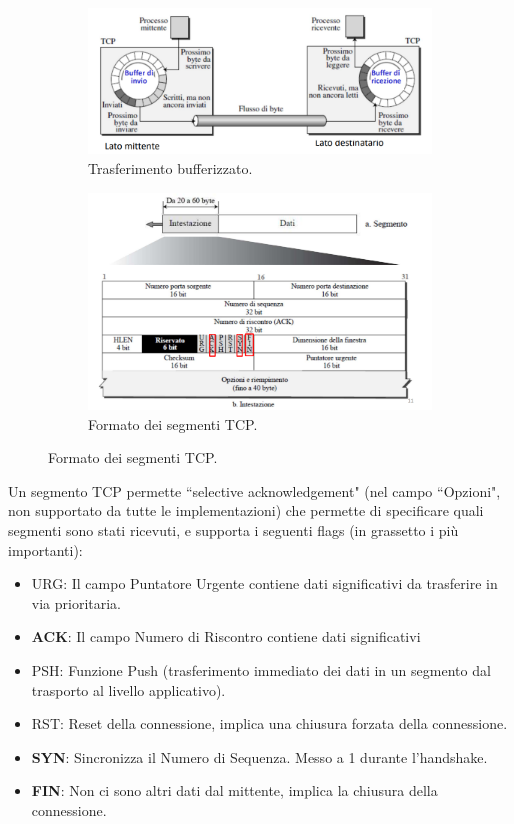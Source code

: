 \documentclass[11pt, italian, openany]{book}
\begin{document}
\begin{sloppypar}
\begin{itemize}[topsep=0pt]
	\begin{figure}[h!]
		\begin{subfigure}{0.49 \linewidth} \centering
			\includegraphics[scale=0.25]{images/tcp-trasferimento-bufferizzato.png}
			\caption{Trasferimento bufferizzato.}
		\end{subfigure}
		\begin{subfigure}{0.49 \linewidth} \centering
			\includegraphics[scale=0.25]{images/tcp-formato-segmenti.png}
			\caption{Formato dei segmenti TCP.}
		\end{subfigure}
	\end{figure}

	Un segmento TCP permette ``selective acknowledgement" (nel campo ``Opzioni", non supportato da tutte le implementazioni) che permette di
	specificare quali segmenti sono stati ricevuti, e supporta i seguenti flags (in grassetto i pi\`u importanti):
	\vspace{-3.5mm}
	\begin{itemize}
		\itemsep-0.3em
		\item URG: Il campo Puntatore Urgente contiene dati significativi da trasferire in via prioritaria.
		\item \textbf{ACK}: Il campo Numero di Riscontro contiene dati significativi
		\item PSH: Funzione Push (trasferimento immediato dei dati in un segmento dal trasporto al livello applicativo).
		\item RST: Reset della connessione, implica una chiusura forzata della connessione.
		\item \textbf{SYN}: Sincronizza il Numero di Sequenza. Messo a 1 durante l'handshake.
		\item \textbf{FIN}: Non ci sono altri dati dal mittente, implica la chiusura della connessione.
	\end{itemize}


\end{itemize}
\end{sloppypar}
\end{document}
